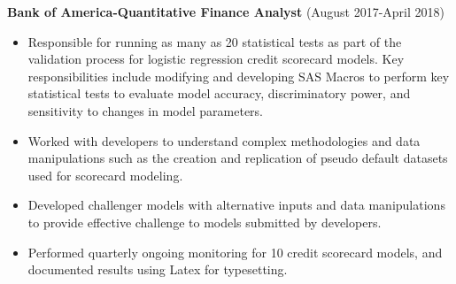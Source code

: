 \documentclass[a4paper,10pt]{article}
\begin{document}
\noindent
\textbf{Bank of America-Quantitative Finance Analyst} (August 2017-April 2018)
\begin{itemize}
\item Responsible for running as many as 20 statistical tests as part of the validation process for logistic regression credit scorecard models.  Key responsibilities include modifying and developing SAS Macros to perform key statistical tests to evaluate model accuracy, discriminatory power, and sensitivity to changes in model parameters.  
\item Worked with developers to understand complex methodologies and data manipulations such as the creation and replication of pseudo default datasets used for scorecard modeling.
\item Developed challenger models with alternative inputs and data manipulations to provide effective challenge to models submitted by developers.
\item Performed quarterly ongoing monitoring for 10 credit scorecard models, and documented results using Latex for typesetting.
\end{itemize}
\end{document}
